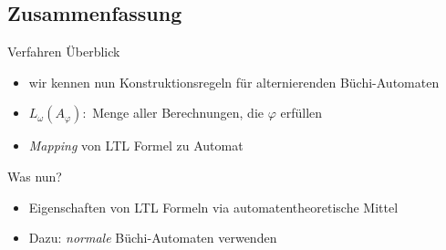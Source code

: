 \subsection{Zusammenfassung}
\begin{frame}{\insertsubsection}
\begin{block}{Verfahren Überblick}
    \begin{itemize}
        \setlength\itemsep{0.7em}
        \item wir kennen nun Konstruktionsregeln für alternierenden Büchi-Automaten
        \item $L_\omega(A_\varphi):$ Menge aller Berechnungen, die $\varphi$ erfüllen
        \item \textit{Mapping} von LTL Formel zu Automat
    \end{itemize}
\end{block}
\begin{block}{Was nun?}
    \begin{itemize}
        \setlength\itemsep{0.7em}
        \item Eigenschaften von LTL Formeln via automatentheoretische Mittel
        \item Dazu: \textit{normale} Büchi-Automaten verwenden
    \end{itemize}
\end{block}
\end{frame}